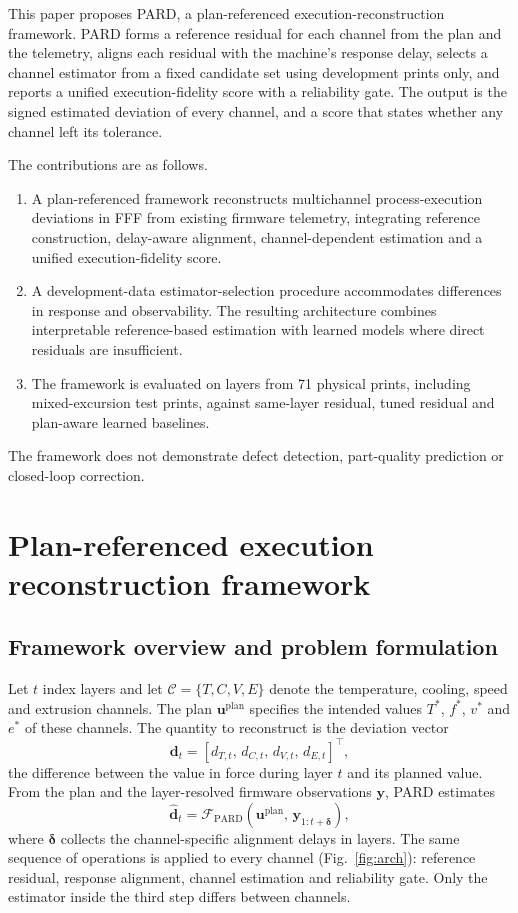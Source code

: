 \documentclass[10pt,a4paper,twocolumn]{article}
\newcommand{\vect}[1]{\bm{#1}}
\begin{document}
This paper proposes PARD, a plan-referenced execution-reconstruction framework. PARD forms a reference residual for each channel from the plan and the telemetry, aligns each residual with the machine's response delay, selects a channel estimator from a fixed candidate set using development prints only, and reports a unified execution-fidelity score with a reliability gate. The output is the signed estimated deviation of every channel, and a score that states whether any channel left its tolerance.

The contributions are as follows.
\begin{enumerate}
\item A plan-referenced framework reconstructs multichannel process-execution deviations in FFF from existing firmware telemetry, integrating reference construction, delay-aware alignment, channel-dependent estimation and a unified execution-fidelity score.
\item A development-data estimator-selection procedure accommodates differences in response and observability. The resulting architecture combines interpretable reference-based estimation with learned models where direct residuals are insufficient.
\item The framework is evaluated on \layersUsed{} layers from 71 physical prints, including \printsTest{} mixed-excursion test prints, against same-layer residual, tuned residual and plan-aware learned baselines.
\end{enumerate}
The framework does not demonstrate defect detection, part-quality prediction or closed-loop correction.

\section{Plan-referenced execution reconstruction framework}
\subsection{Framework overview and problem formulation}
Let $t$ index layers and let $\mathcal{C}=\{T,C,V,E\}$ denote the temperature, cooling, speed and extrusion channels. The plan $\vect{u}^{\mathrm{plan}}$ specifies the intended values $T^{*}$, $f^{*}$, $v^{*}$ and $e^{*}$ of these channels. The quantity to reconstruct is the deviation vector
\begin{equation}
\vect{d}_t=\left[d_{T,t},\,d_{C,t},\,d_{V,t},\,d_{E,t}\right]^{\top},
\end{equation}
the difference between the value in force during layer $t$ and its planned value. From the plan and the layer-resolved firmware observations $\vect{y}$, PARD estimates
\begin{equation}
\widehat{\vect{d}}_t=\mathcal{F}_{\mathrm{PARD}}\!\left(\vect{u}^{\mathrm{plan}},\,\vect{y}_{1:t+\bm{\delta}}\right),
\end{equation}
where $\bm{\delta}$ collects the channel-specific alignment delays in layers. The same sequence of operations is applied to every channel (Fig.~\ref{fig:arch}): reference residual, response alignment, channel estimation and reliability gate. Only the estimator inside the third step differs between channels.
\end{document}
